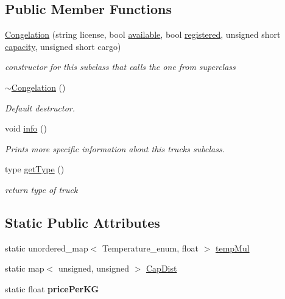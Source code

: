 \subsection*{Public Member Functions}
\begin{DoxyCompactItemize}
\item 
\hyperlink{class_congelation_a320f8a45809dbe0d770f9f77d49b3629}{Congelation} (string license, bool \hyperlink{class_truck_a4189fe5ed32f6084459a9c5ae1eb7c2a}{available}, bool \hyperlink{class_truck_a80b8405cf7a15b236fef70116f99c4fb}{registered}, unsigned short \hyperlink{class_truck_ab004524786ae7aebf7c7bdb5e1599696}{capacity}, unsigned short cargo)
\begin{DoxyCompactList}\small\item\em constructor for this subclass that calls the one from superclass \end{DoxyCompactList}\item 
\hyperlink{class_congelation_a7aa24e7127ec7c1d9d01043b665ae66f}{$\sim$\+Congelation} ()
\begin{DoxyCompactList}\small\item\em Default destructor. \end{DoxyCompactList}\item 
void \hyperlink{class_congelation_ac2f7cb9aeeeb9428a9a973e6a2c63942}{info} ()
\begin{DoxyCompactList}\small\item\em Prints more specific information about this truck\textquotesingle{}s subclass. \end{DoxyCompactList}\item 
type \hyperlink{class_congelation_a5026bd6791faeae03fbf1ad84f9bbc08}{get\+Type} ()
\begin{DoxyCompactList}\small\item\em return type of truck \end{DoxyCompactList}\end{DoxyCompactItemize}
\subsection*{Static Public Attributes}
\begin{DoxyCompactItemize}
\item 
static unordered\+\_\+map$<$ Temperature\+\_\+enum, float $>$ \hyperlink{class_congelation_aa0cf9fa825aa450ff04d58e5e733706b}{temp\+Mul}
\item 
static map$<$ unsigned, unsigned $>$ \hyperlink{class_congelation_aaa0f7881a3e1e58c35176bdd22e27425}{Cap\+Dist}
\item 
\mbox{\label{class_congelation_ab30061aebb6a0fa59ec3f40e9de0ca34}} 
static float {\bfseries price\+Per\+KG}
\end{DoxyCompactItemize}

